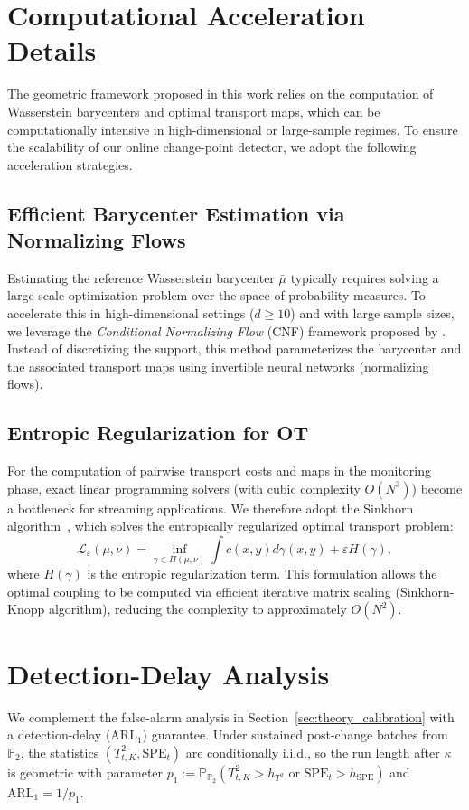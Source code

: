 \documentclass{article}
\theoremstyle{plain}
\theoremstyle{definition}
\theoremstyle{remark}
\begin{document}
\section{Computational Acceleration Details}
\label{app:computation}

The geometric framework proposed in this work relies on the computation of Wasserstein barycenters and optimal transport maps, which can be computationally intensive in high-dimensional or large-sample regimes. To ensure the scalability of our online change-point detector, we adopt the following acceleration strategies.

\subsection{Efficient Barycenter Estimation via Normalizing Flows}
Estimating the reference Wasserstein barycenter $\bar{\mu}$ typically requires solving a large-scale optimization problem over the space of probability measures. To accelerate this in high-dimensional settings ($d \ge 10$) and with large sample sizes, we leverage the \emph{Conditional Normalizing Flow} (CNF) framework proposed by \citet{visentin2026computing}.
Instead of discretizing the support, this method parameterizes the barycenter and the associated transport maps using invertible neural networks (normalizing flows). 

\subsection{Entropic Regularization for OT}
For the computation of pairwise transport costs and maps in the monitoring phase, exact linear programming solvers (with cubic complexity $O(N^3)$) become a bottleneck for streaming applications.
We therefore adopt the Sinkhorn algorithm~\citep{cuturi2013sinkhorn}, which solves the entropically regularized optimal transport problem:
\[
\mathcal{L}_{\varepsilon}(\mu, \nu) = \inf_{\gamma \in \Pi(\mu, \nu)} \int c(x,y) d\gamma(x,y) + \varepsilon H(\gamma),
\]
where $H(\gamma)$ is the entropic regularization term.
This formulation allows the optimal coupling to be computed via efficient iterative matrix scaling (Sinkhorn-Knopp algorithm), reducing the complexity to approximately $O(N^2)$. 

\section{Detection-Delay Analysis}\label{app:arl1}
We complement the false-alarm analysis in Section~\ref{sec:theory_calibration} with a detection-delay ($\mathrm{ARL}_1$) guarantee. 
Under sustained post-change batches from $\mathbb{P}_2$, the
statistics $(T^2_{t,K}, \mathrm{SPE}_t)$ are conditionally i.i.d.,
so the run length after $\kappa$ is geometric with parameter
$p_1 := \mathbb{P}_{\mathbb{P}_2}(T^2_{t,K} > h_{T^2}
\text{ or } \mathrm{SPE}_t > h_{\mathrm{SPE}})$
and $\mathrm{ARL}_1 = 1/p_1$.
\end{document}

